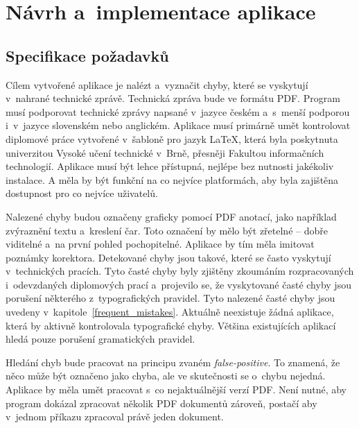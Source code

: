 



\chapter{Návrh a~implementace aplikace}

\dummyText


\section{Specifikace požadavků}
Cílem vytvořené aplikace je nalézt a~vyznačit chyby, které se vyskytují
v~nahrané technické zprávě. Technická zpráva bude ve formátu PDF.
Program musí podporovat technické zprávy napsané v~jazyce českém a~s~menší
podporou i~v~jazyce slovenském nebo anglickém. Aplikace musí primárně umět
kontrolovat diplomové práce vytvořené v~šabloně pro jazyk {\LaTeX}, která byla
poskytnuta univerzitou Vysoké učení technické v~Brně, přesněji Fakultou
informačních technologií. Aplikace musí
být lehce přístupná, nejlépe bez nutnosti jakékoliv instalace.
A měla by být funkční na co nejvíce platformách, aby byla zajištěna dostupnost pro
co nejvíce uživatelů.

Nalezené
chyby budou označeny graficky pomocí PDF anotací, jako například zvýraznění textu
a~kreslení čar. Toto označení by mělo být zřetelné -- dobře viditelné
a~na první pohled pochopitelné. Aplikace by tím měla imitovat poznámky korektora.
Detekované chyby jsou takové, které se často vyskytují v~technických pracích.
Tyto časté chyby byly zjištěny zkoumáním rozpracovaných i~odevzdaných
diplomových prací a~projevilo se, že vyskytované časté chyby jsou porušení
některého z~typografických pravidel. Tyto nalezené časté chyby jsou uvedeny
v~kapitole~\ref{frequent_mistakes}. 
Aktuálně neexistuje žádná aplikace, která by aktivně kontrolovala typografické
chyby. Většina existujících aplikací hledá pouze porušení gramatických pravidel.

Hledání chyb bude pracovat na principu zvaném \emph{false-positive}. To znamená,
že něco může být označeno jako chyba, ale ve skutečnosti se o~chybu nejedná.
Aplikace by měla umět pracovat s~co nejaktuálnější verzí PDF. Není nutné, aby
program dokázal zpracovat několik PDF dokumentů zároveň, postačí aby v~jednom příkazu
zpracoval právě jeden dokument.



